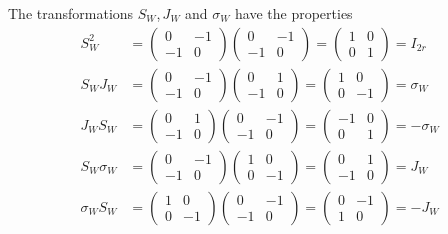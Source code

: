 \documentclass[aps,preprint]{revtex4}
\begin{document}
The transformations $S_{W}$,$\,J_{W}$ and $\sigma _{W}$ have the properties 
\begin{align}
S_{W}^{2}& =\left( 
\begin{array}{cc}
0 & -1 \\ 
-1 & 0%
\end{array}%
\right) \left( 
\begin{array}{cc}
0 & -1 \\ 
-1 & 0%
\end{array}%
\right) =\left( 
\begin{array}{cc}
1 & 0 \\ 
0 & 1%
\end{array}%
\right) =I_{2r} \\
S_{W}J_{W}& =\left( 
\begin{array}{cc}
0 & -1 \\ 
-1 & 0%
\end{array}%
\right) \left( 
\begin{array}{cc}
0 & 1 \\ 
-1 & 0%
\end{array}%
\right) =\left( 
\begin{array}{cc}
1 & 0 \\ 
0 & -1%
\end{array}%
\right) =\sigma _{W} \\
J_{W}S_{W}& =\left( 
\begin{array}{cc}
0 & 1 \\ 
-1 & 0%
\end{array}%
\right) \left( 
\begin{array}{cc}
0 & -1 \\ 
-1 & 0%
\end{array}%
\right) =\left( 
\begin{array}{cc}
-1 & 0 \\ 
0 & 1%
\end{array}%
\right) =-\sigma _{W} \\
S_{W}\sigma _{W}& =\left( 
\begin{array}{cc}
0 & -1 \\ 
-1 & 0%
\end{array}%
\right) \left( 
\begin{array}{cc}
1 & 0 \\ 
0 & -1%
\end{array}%
\right) =\left( 
\begin{array}{cc}
0 & 1 \\ 
-1 & 0%
\end{array}%
\right) =J_{W} \\
\sigma _{W}S_{W}& =\left( 
\begin{array}{cc}
1 & 0 \\ 
0 & -1%
\end{array}%
\right) \left( 
\begin{array}{cc}
0 & -1 \\ 
-1 & 0%
\end{array}%
\right) =\left( 
\begin{array}{cc}
0 & -1 \\ 
1 & 0%
\end{array}%
\right) =-J_{W}
\end{align}%
\end{document}
